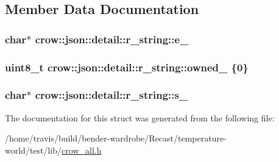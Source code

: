 \subsection{Member Data Documentation}
\hypertarget{structcrow_1_1json_1_1detail_1_1r__string_adeb368c4c0dfeb349bb32129e8dee23b}{
\subsubsection[{e\-\_\-}]{\setlength{\rightskip}{0pt plus 5cm}char$\ast$ crow\-::json\-::detail\-::r\-\_\-string\-::e\-\_\-\hspace{0.3cm}{\ttfamily [mutable]}}}\label{structcrow_1_1json_1_1detail_1_1r__string_adeb368c4c0dfeb349bb32129e8dee23b}
\hypertarget{structcrow_1_1json_1_1detail_1_1r__string_aebfcc625db6a89f8c358292165a2fdd2}{
\subsubsection[{owned\-\_\-}]{\setlength{\rightskip}{0pt plus 5cm}uint8\-\_\-t crow\-::json\-::detail\-::r\-\_\-string\-::owned\-\_\- \{0\}}}\label{structcrow_1_1json_1_1detail_1_1r__string_aebfcc625db6a89f8c358292165a2fdd2}
\hypertarget{structcrow_1_1json_1_1detail_1_1r__string_a9a0a048fb2cb904e8336926817947448}{
\subsubsection[{s\-\_\-}]{\setlength{\rightskip}{0pt plus 5cm}char$\ast$ crow\-::json\-::detail\-::r\-\_\-string\-::s\-\_\-}}\label{structcrow_1_1json_1_1detail_1_1r__string_a9a0a048fb2cb904e8336926817947448}


The documentation for this struct was generated from the following file\-:\begin{DoxyCompactItemize}
\item 
/home/travis/build/bender-\/wardrobe/\-Recast/temperature-\/world/test/lib/\hyperlink{crow__all_8h}{crow\-\_\-all.\-h}\end{DoxyCompactItemize}
